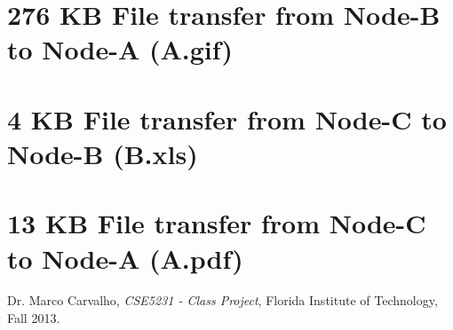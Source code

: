 \documentclass{scrartcl}
\begin{document}
\section{276 KB File transfer from Node-B to Node-A (A.gif)}

\newpage
\section{4 KB File transfer from Node-C to Node-B (B.xls)}

\newpage
\section{13 KB File transfer from Node-C to Node-A (A.pdf)} \label{appendix:runlast}


\newpage
%
%
\begin{thebibliography}{30}
 Dr. Marco Carvalho, \emph{CSE5231 - Class Project}, Florida Institute of Technology, Fall 2013.
    
\end{thebibliography}
\end{document}
